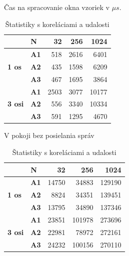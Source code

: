 \begin{table}[h]
     \def\arraystretch{1.25}
	 \centering
     \captionsetup[subtable]{position=below}
     \captionsetup[table]{position=below}
     \caption{Čas na spracovanie okna vzoriek v $\mu s$.}

     \begin{subtable}{0.48\linewidth}
         \centering
		\begin{tabular}{|l|l|r|r|r|}
		\hline
		\textbf{}                       & \textbf{N}  & \textbf{32} & \textbf{256} & \textbf{1024} \\ \hline
		\multirow{3}{*}{\textbf{1 os}}  & \textbf{A1} & 518         & 2616         & 6401          \\ \cline{2-5}
 		                                & \textbf{A2} & 435         & 1598         & 6209          \\ \cline{2-5}
                                        & \textbf{A3} & 467         & 1695         & 3864          \\ \hline
		\multirow{3}{*}{\textbf{3 osi}} & \textbf{A1} & 2503        & 3077         & 10177         \\ \cline{2-5}
                                        & \textbf{A2} & 556         & 3340         & 10334         \\ \cline{2-5}
                                        & \textbf{A3} & 591         & 1295         & 4670          \\ \hline
		\end{tabular}
		\caption{V pokoji bez posielania správ}
		\label{tab:pipeline-simple}
	\end{subtable}
    \hfill
    \begin{subtable}{0.48\linewidth}
         \centering
		\begin{tabular}{|l|l|r|r|r|}
		\hline
		\textbf{}                       & \textbf{N}  & \textbf{32} & \textbf{256} & \textbf{1024} \\ \hline
		\multirow{3}{*}{\textbf{1 os}}  & \textbf{A1} & 14750       & 34883        & 129190        \\ \cline{2-5}
                              			& \textbf{A2} & 8824        & 34351        & 139451        \\ \cline{2-5}
                                        & \textbf{A3} & 13795       & 34890        & 137346        \\ \hline
		\multirow{3}{*}{\textbf{3 osi}} & \textbf{A1} & 23851       & 101978       & 273696        \\ \cline{2-5}
                                        & \textbf{A2} & 22981       & 78972        & 272161        \\ \cline{2-5}
                                        & \textbf{A3} & 24232       & 100156       & 270110        \\ \hline
		\end{tabular}
		\caption{Štatistiky s koreláciami a udalosti}
		\label{tab:pipeline-complex}
	\end{subtable}
\end{table}


